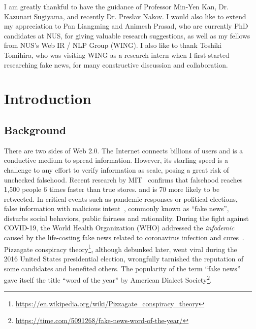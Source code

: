 \documentclass[fyp]{socreport}
\theoremstyle{definition}
\theoremstyle{hypothesis}
\begin{document}
\begin{acknowledgement}
I am greatly thankful to have the guidance of Professor Min-Yen Kan, Dr. Kazunari Sugiyama, and recently Dr. Preslav Nakov. I would also like to extend my appreciation to Pan Liangming and Animesh Prasad, who are currently PhD candidates at NUS, for giving valuable research suggestions, as well as my fellows from NUS's Web IR / NLP Group (WING). I also like to thank Toshiki Tomihira, who was visiting WING as a research intern when I first started researching fake news, for many constructive discussion and collaboration.
\end{acknowledgement}

\listoffigures 
\listoftables
\tableofcontents 

\chapter{Introduction}
\label{ch:introduction}
\section{Background}
There are two sides of Web 2.0. The Internet connects billions of users and is a conductive medium to spread information. However, its starling speed is a challenge to any effort to verify information as scale, posing a great risk of unchecked falsehood. Recent research by MIT~\cite{vosoughi2018spread} confirms that falsehood reaches 1,500 people 6 times faster than true stores. and is 70 more likely to be retweeted. In critical events such as pandemic responses or political elections, false information with malicious intent~\cite{shu2017fake}, commonly known as ``fake news'', disturbs social behaviors, public fairness and rationality. During the fight against COVID-19, the World Health Organization (WHO) addressed the \textit{infodemic} caused by the life-costing fake news related to coronavirus infection and cures~\cite{thomas_2020}. Pizzagate conspiracy theory\footnote{\scriptsize{\url{https://en.wikipedia.org/wiki/Pizzagate_conspiracy_theory}}}, although debunked later, went viral during the 2016 United States presidential election, wrongfully tarnished the reputation of some candidates and benefited others. 
The popularity of the term ``fake news'' gave itself the title ``word of the year'' by American Dialect Society\footnote{\scriptsize{\url{https://time.com/5091268/fake-news-word-of-the-year/}}}.
\end{document}
